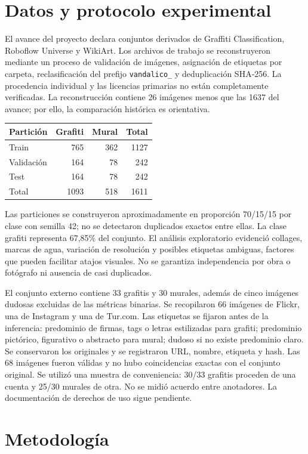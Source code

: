 \documentclass[10pt,a4paper]{article}
\begin{document}
\section{Datos y protocolo experimental}
El avance del proyecto declara conjuntos derivados de Graffiti Classification, Roboflow Universe y WikiArt. Los archivos de trabajo se reconstruyeron mediante un proceso de validación de imágenes, asignación de etiquetas por carpeta, reclasificación del prefijo \texttt{vandalico\_} y deduplicación SHA-256. La procedencia individual y las licencias primarias no están completamente verificadas. La reconstrucción contiene 26 imágenes menos que las 1637 del avance; por ello, la comparación histórica es orientativa.
\begin{center}
\begin{tabular}{lrrr}\toprule Partición & Grafiti & Mural & Total\\\midrule Train &765&362&1127\\ Validación&164&78&242\\ Test&164&78&242\\\midrule Total&1093&518&1611\\\bottomrule\end{tabular}
\end{center}
\newpage
Las particiones se construyeron aproximadamente en proporción 70/15/15 por clase con semilla 42; no se detectaron duplicados exactos entre ellas. La clase grafiti representa 67,85\% del conjunto. El análisis exploratorio evidenció collages, marcas de agua, variación de resolución y posibles etiquetas ambiguas, factores que pueden facilitar atajos visuales. No se garantiza independencia por obra o fotógrafo ni ausencia de casi duplicados.

El conjunto externo contiene 33 grafitis y 30 murales, además de cinco imágenes dudosas excluidas de las métricas binarias. Se recopilaron 66 imágenes de Flickr, una de Instagram y una de Tur.com. Las etiquetas se fijaron antes de la inferencia: predominio de firmas, tags o letras estilizadas para grafiti; predominio pictórico, figurativo o abstracto para mural; dudoso si no existe predominio claro. Se conservaron los originales y se registraron URL, nombre, etiqueta y hash. Las 68 imágenes fueron válidas y no hubo coincidencias exactas con el conjunto original. Se utilizó una muestra de conveniencia: 30/33 grafitis proceden de una cuenta y 25/30 murales de otra. No se midió acuerdo entre anotadores. La documentación de derechos de uso sigue pendiente.
\section{Metodología}
\end{document}
